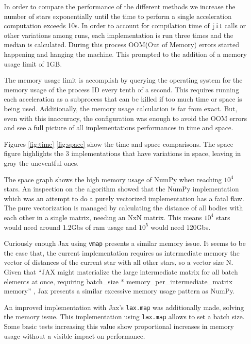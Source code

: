 \documentclass[a4paper, 11pt]{article}         %
\begin{document}
In order to compare the performance of the different methods we increase the number of stars exponentially until the time to perform a single acceleration computation 
exceeds 10s. In order to account for compilation time of \texttt{jit} calls or other variations among runs, each implementation is run three times and the median is calculated.
During this process OOM(Out of Memory) errors started happening and hanging the machine.
This prompted to the addition of a memory usage limit of 1GB. 

The memory usage limit is accomplish by querying the operating system for the memory usage of the process ID every tenth of a second. This requires running each acceleration as a subprocess that can be killed if too much time or space is being used. Additionally, the memory usage calculation is far from exact.
But, even with this inaccuracy, the configuration was enough to avoid the OOM errors and see a full picture of all implementations performances in time and space.


Figures \ref{fig:time} \ref{fig:space} show the time and space comparisons. The space figure highlights the 3 implementations that have variations in space, leaving in gray the uneventful ones. 

The space graph shows the high memory usage of NumPy when reaching $10^4$ stars.
An inspection on the algorithm showed that the NumPy implementation which was an attempt to do a purely vectorized implementation has a fatal flaw. The pure vectorization is managed by calculating the distance of all bodies with each other in a single matrix, needing an NxN matrix. This means $10^4$ stars would need around 1.2Gbs of ram usage and $10^5$ would need 120Gbs.

Curiously enough Jax using \texttt{vmap} presents a similar memory issue.
It seems to be the case that, the current implementation requires as intermediate memory the vector of distances of the current star with all other stars, so a vector size N. Given that ``JAX might materialize the large intermediate matrix for all batch elements at once, requiring batch\_size * memory\_per\_intermediate\_matrix memory'' \parencite{JaxPerformance}, Jax presents a similar excessive memory usage pattern as NumPy.

An improved implementation with Jax's \texttt{lax.map} was additionally made, solving the memory issue.
This implementation using \texttt{lax.map} allows to set a batch size. Some basic tests increasing this value show proportional increases in memory usage without a visible impact on performance.
\end{document}

